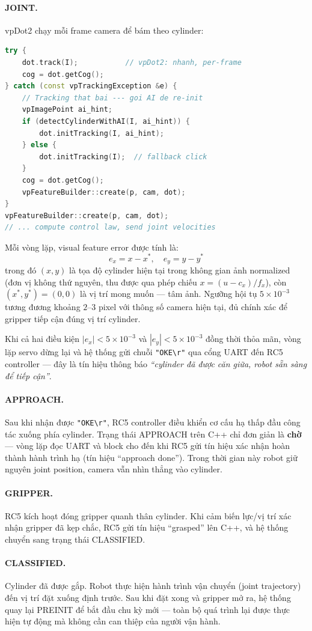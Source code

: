 \paragraph{JOINT.}
vpDot2 chạy mỗi frame camera để bám theo cylinder:
\begin{lstlisting}[language=C++]
try {
    dot.track(I);           // vpDot2: nhanh, per-frame
    cog = dot.getCog();
} catch (const vpTrackingException &e) {
    // Tracking that bai --- goi AI de re-init
    vpImagePoint ai_hint;
    if (detectCylinderWithAI(I, ai_hint)) {
        dot.initTracking(I, ai_hint);
    } else {
        dot.initTracking(I);  // fallback click
    }
    cog = dot.getCog();
    vpFeatureBuilder::create(p, cam, dot);
}
vpFeatureBuilder::create(p, cam, dot);
// ... compute control law, send joint velocities
\end{lstlisting}

Mỗi vòng lặp, visual feature error được tính là:
\[
  e_x = x - x^*, \quad e_y = y - y^*
\]
trong đó $(x,y)$ là tọa độ cylinder hiện tại trong không gian ảnh
normalized (đơn vị không thứ nguyên, thu được qua phép chiếu
$x = (u - c_x)/f_x$), còn $(x^*, y^*) = (0, 0)$ là vị trí mong
muốn --- tâm ảnh. Ngưỡng hội tụ $5{\times}10^{-3}$ tương đương
khoảng $2$--$3$ pixel với thông số camera hiện tại, đủ chính xác
để gripper tiếp cận đúng vị trí cylinder.

Khi cả hai điều kiện $|e_x| < 5{\times}10^{-3}$ và
$|e_y| < 5{\times}10^{-3}$ đồng thời thỏa mãn, vòng lặp servo
dừng lại và hệ thống gửi chuỗi \texttt{"OKE\textbackslash r"} qua
cổng UART đến RC5 controller --- đây là tín hiệu thông báo
\textit{``cylinder đã được căn giữa, robot sẵn sàng để tiếp
cận''}.

\paragraph{APPROACH.}
Sau khi nhận được \texttt{"OKE\textbackslash r"}, RC5 controller
điều khiển cơ cấu hạ thấp đầu công tác xuống phía cylinder.
Trạng thái APPROACH trên C++ chỉ đơn giản là \textbf{chờ} ---
vòng lặp đọc UART và block cho đến khi RC5 gửi tín hiệu xác nhận
hoàn thành hành trình hạ (tín hiệu ``approach done''). Trong thời
gian này robot giữ nguyên joint position, camera vẫn nhìn thẳng
vào cylinder.

\paragraph{GRIPPER.}
RC5 kích hoạt đóng gripper quanh thân cylinder. Khi cảm biến
lực/vị trí xác nhận gripper đã kẹp chắc, RC5 gửi tín hiệu
``grasped'' lên C++, và hệ thống chuyển sang trạng thái
CLASSIFIED.

\paragraph{CLASSIFIED.}
Cylinder đã được gắp. Robot thực hiện hành trình vận chuyển
(joint trajectory) đến vị trí đặt xuống định trước. Sau khi đặt
xong và gripper mở ra, hệ thống quay lại PREINIT để bắt đầu
chu kỳ mới --- toàn bộ quá trình lại được thực hiện tự động mà
không cần can thiệp của người vận hành.
